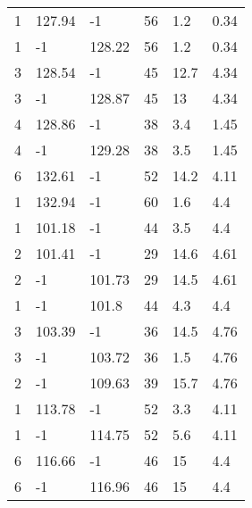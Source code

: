 \begin{table*}[h!]
\begin{tabular*}{\linewidth}{p{50pt}<{\centering}p{50pt}<{\centering}
    p{60pt}<{\centering}p{60pt}<{\centering}p{60pt}<{\centering}p{70pt}<{\centering}}
    1 & 127.94 & -1 & 56 & 1.2 & 0.34 \\
    1 & -1 & 128.22 & 56 & 1.2 & 0.34 \\
    3 & 128.54 & -1 & 45 & 12.7 & 4.34 \\
    3 & -1 & 128.87 & 45 & 13 & 4.34 \\
    4 & 128.86 & -1 & 38 & 3.4 & 1.45 \\
    4 & -1 & 129.28 & 38 & 3.5 & 1.45 \\
    6 & 132.61 & -1 & 52 & 14.2 & 4.11 \\
    1 & 132.94 & -1 & 60 & 1.6 & 4.4 \\
    1 & 101.18 & -1 & 44 & 3.5 & 4.4 \\
    2 & 101.41 & -1 & 29 & 14.6 & 4.61 \\
    2 & -1 & 101.73 & 29 & 14.5 & 4.61 \\
    1 & -1 & 101.8 & 44 & 4.3 & 4.4 \\
    3 & 103.39 & -1 & 36 & 14.5 & 4.76 \\
    3 & -1 & 103.72 & 36 & 1.5 & 4.76 \\
    2 & -1 & 109.63 & 39 & 15.7 & 4.76 \\
    1 & 113.78 & -1 & 52 & 3.3 & 4.11 \\
    1 & -1 & 114.75 & 52 & 5.6 & 4.11 \\
    6 & 116.66 & -1 & 46 & 15 & 4.4 \\
    6 & -1 & 116.96 & 46 & 15 & 4.4 \\
    \bottomrule
  \end{tabular*}
  \label{Ap4}
\end{table*}






